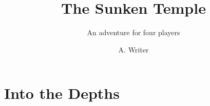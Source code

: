 \documentclass[columns=1]{rpgbook}
\title{The Sunken Temple}
\subtitle{An adventure for four players}
\author{A. Writer}
\date{}
\begin{document}
	\maketitle
	\part[../../img/the_mermaid_2008.115.1238.jpg]{Into the Depths}
\end{document}
